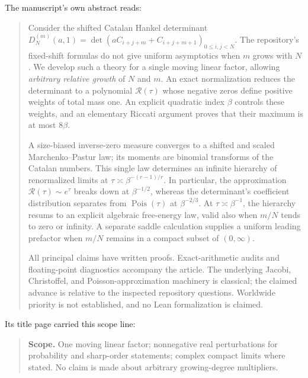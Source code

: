 \documentclass[11pt,a4paper]{article}
\numberwithin{equation}{section}
\theoremstyle{definition}
\theoremstyle{remark}
\newcommand{\Rgs}{\mathcal R}
\newcommand{\Pois}{\operatorname{Pois}}
\begin{document}
The manuscript's own abstract reads:
\begin{quote}\small
Consider the shifted Catalan Hankel determinant
$D_N^{(m)}(a,1)=\det(aC_{i+j+m}+C_{i+j+m+1})_{0\le i,j<N}$.
The repository's fixed-shift formulas do not give uniform asymptotics when
$m$ grows with $N$. We develop such a theory for a single moving linear
factor, allowing \emph{arbitrary relative growth} of $N$ and $m$.
An exact normalization reduces the determinant to a polynomial $\Rgs(\tau)$
whose negative zeros define positive weights of total mass one. An explicit
quadratic index $\beta$ controls these weights, and an elementary Riccati
argument proves that their maximum is at most $8\beta$.

A size-biased inverse-zero measure converges to a shifted and scaled
Marchenko--Pastur law; its moments are binomial transforms of the Catalan
numbers. This single law determines an infinite hierarchy of renormalized
limits at $\tau\asymp\beta^{-(r-1)/r}$. In particular, the approximation
$\Rgs(\tau)\sim e^\tau$ breaks down at $\beta^{-1/2}$, whereas the
determinant's coefficient distribution separates from $\Pois(\tau)$ at
$\beta^{-2/3}$.  At $\tau\asymp\beta^{-1}$, the hierarchy resums to an
explicit algebraic free-energy law, valid also when $m/N$ tends to zero or
infinity.  A separate saddle calculation supplies a uniform leading
prefactor when $m/N$ remains in a compact subset of $(0,\infty)$.

All principal claims have written proofs. Exact-arithmetic audits and
floating-point diagnostics accompany the article. The underlying Jacobi,
Christoffel, and Poisson-approximation machinery is classical; the claimed
advance is relative to the inspected repository questions. Worldwide
priority is not established, and no Lean formalization is claimed.
\end{quote}
Its title page carried this scope line:
\begin{quote}\small
\textbf{Scope.} One moving linear factor; nonnegative real perturbations for
probability and sharp-order statements; complex compact limits where stated.
No claim is made about arbitrary growing-degree multipliers.
\end{quote}
\end{document}
